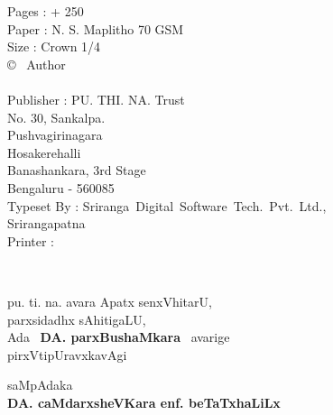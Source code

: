 \noindent
{\rm 
Pages : + 250\\[3pt]
Paper : N. S. Maplitho 70 GSM\\
Size : Crown 1/4\\[3pt]
\copyright~ Author\\[30pt]
\rupee \\[30pt]
Publisher : PU. THI. NA. Trust\\
No. 30, Sankalpa.\\
Pushvagirinagara\\
Hosakerehalli\\
Banashankara, 3rd Stage\\
Bengaluru - 560085\\[15pt]
Typeset By : \hbox{Sriranga Digital Software Tech. Pvt. Ltd.,}\\
Srirangapatna\\[15pt]
Printer :}

\newpage

\thispagestyle{empty}
~\phantom{a}

\vfill

\begin{minipage}[c]{8cm}
\begin{center}
pu. ti. na. avara Apatx senxVhitarU,\\[3pt]
parxsidadhx sAhitigaLU,\\[3pt]
Ada~ {\large\bf DA. parxBushaMkara}~ avarige\\[3pt]
pirxVtipUravxkavAgi
\end{center}

\bigskip

\begin{flushright}
saMpAdaka\hspace{1.2cm}\,\\[3pt]
{\bf DA. caMdarxsheVKara enf. beTaTxhaLiLx}
\end{flushright}
\end{minipage}

\vfill\eject

\thispagestyle{empty}
~\phantom{a}


